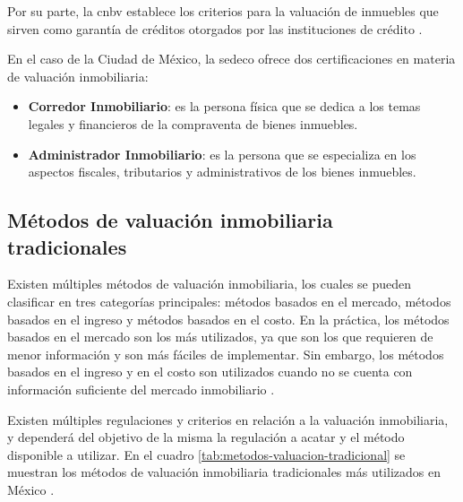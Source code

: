 Por su parte, la \acrfull{cnbv} establece los criterios para la valuación de
inmuebles que sirven como garantía de créditos otorgados por las instituciones
de crédito \cite{cnbv2023}.

En el caso de la Ciudad de México, la \acrfull{sedeco} ofrece dos certificaciones
en materia de valuación inmobiliaria\cite{inmuebles24certificacion}:

\begin{itemize}
  \item \textbf{Corredor Inmobiliario}: es la persona física que se dedica a los
  temas legales y financieros de la compraventa de bienes inmuebles.
  \item \textbf{Administrador Inmobiliario}: es la persona que se especializa
  en los aspectos fiscales, tributarios y administrativos de los bienes inmuebles.
\end{itemize}

\subsection{Métodos de valuación inmobiliaria tradicionales}
Existen múltiples métodos de valuación inmobiliaria, los cuales se pueden
clasificar en tres categorías principales: métodos basados en el mercado,
métodos basados en el ingreso y métodos basados en el costo. En la práctica,
los métodos basados en el mercado son los más utilizados, ya que son los que
requieren de menor información y son más fáciles de implementar. Sin embargo,
los métodos basados en el ingreso y en el costo son utilizados cuando no se
cuenta con información suficiente del mercado inmobiliario \cite{mexhome2021}.

Existen múltiples regulaciones y criterios en relación a la valuación inmobiliaria,
y dependerá del objetivo de la misma la regulación a acatar y el método disponible
a utilizar. En el cuadro \ref{tab:metodos-valuacion-tradicional} se muestran los
métodos de valuación inmobiliaria tradicionales más utilizados en México \cite{mexhome2021}.

